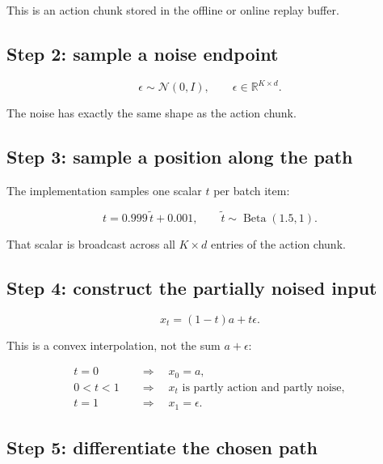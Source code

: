 \documentclass[11pt]{article}
\newcommand{\Normal}{\mathcal{N}}
\begin{document}
This is an action chunk stored in the offline or online replay buffer.

\subsection*{Step 2: sample a noise endpoint}

\begin{equation}
    \epsilon\sim\Normal(0,I),
    \qquad
    \epsilon\in\mathbb{R}^{K\times d}.
\end{equation}

The noise has exactly the same shape as the action chunk.

\subsection*{Step 3: sample a position along the path}

The implementation samples one scalar $t$ per batch item:

\begin{equation}
    t=0.999\,\widetilde{t}+0.001,
    \qquad
    \widetilde{t}\sim\operatorname{Beta}(1.5,1).
\end{equation}

That scalar is broadcast across all $K\times d$ entries of the action chunk.

\subsection*{Step 4: construct the partially noised input}

\begin{equation}
    x_t=(1-t)a+t\epsilon.
    \label{eq:path}
\end{equation}

This is a convex interpolation, not the sum $a+\epsilon$:

\begin{align}
    t=0 &\quad\Longrightarrow\quad x_0=a,
    \\
    0<t<1 &\quad\Longrightarrow\quad x_t
        \text{ is partly action and partly noise},
    \\
    t=1 &\quad\Longrightarrow\quad x_1=\epsilon.
\end{align}

\subsection*{Step 5: differentiate the chosen path}
\end{document}
